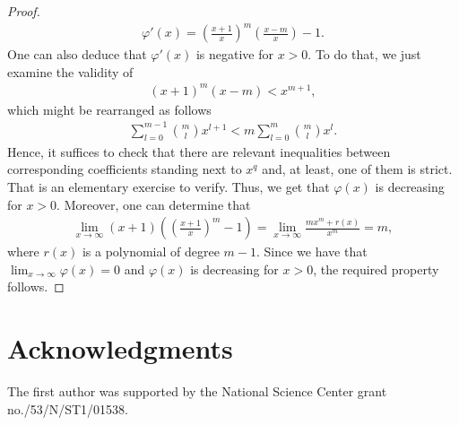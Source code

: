\documentclass[12pt]{amsart}
\theoremstyle{definition}
\theoremstyle{remark}
\numberwithin{theorem}{section} \numberwithin{equation}{section}
\begin{document}
\begin{proof}
\begin{align*}
\varphi '(x)=\left(\frac{x+1}{x}\right)^m\left(\frac{x-m}{x}\right)-1.
\end{align*} 
One can also deduce that $\varphi '(x)$ is negative for $x>0$. To do that, we just examine the validity of
\begin{align*}
(x+1)^m(x-m)<x^{m+1},
\end{align*}
which might be rearranged as follows
\begin{align*}
\sum_{l=0}^{m-1}\binom{m}{l}x^{l+1}<m\sum_{l=0}^m\binom{m}{l}x^l.
\end{align*}
Hence, it suffices to check that there are relevant inequalities between corresponding coefficients standing next to $x^q$ and, at least, one of them is strict. That is an elementary exercise to verify. Thus, we get that $\varphi (x)$ is decreasing for $x>0$. Moreover, one can determine that
\begin{align*}
\lim_{x\to\infty}(x+1)\left(\left(\frac{x+1}{x}\right)^m-1\right)=\lim_{x\to\infty}\frac{mx^m+r(x)}{x^m}=m,
\end{align*} 
where $r(x)$ is a polynomial of degree $m-1$. Since we have that $\lim_{x\to\infty}\varphi (x)=0$ and $\varphi (x)$ is decreasing for $x>0$, the required property follows.
\end{proof}

\section*{Acknowledgments}
The first author was supported by the National Science Center grant no./53/N/ST1/01538.
\end{document}
